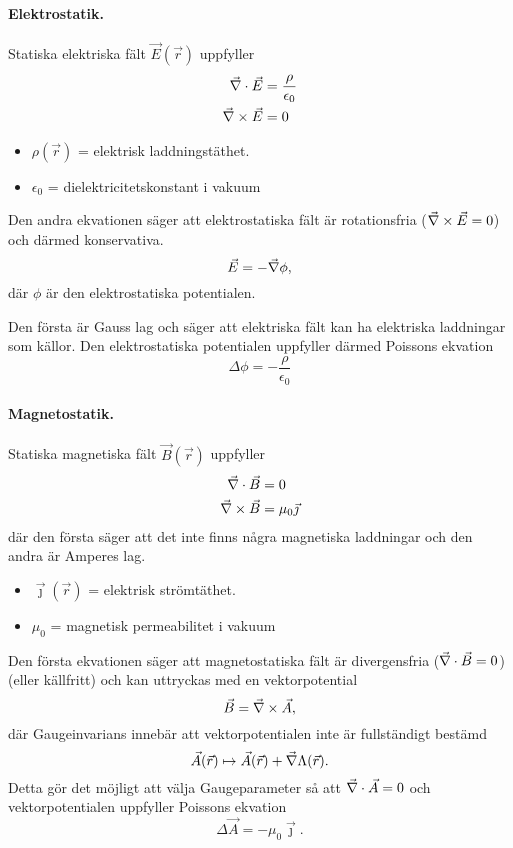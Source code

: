 \documentclass[%
oneside,                 %
final,                   %
10pt]{article}
\begin{document}
\paragraph{Elektrostatik.}


\vspace{3mm}


Statiska elektriska fält $\vec{E}(\vec{r})$ uppfyller
\begin{align}
  \vec{\nabla} \cdot \vec{E} &= \frac{\rho}{\epsilon_0} \\
  \vec{\nabla} \times \vec{E} &= 0
\end{align}
\begin{itemize}
\item $\rho(\vec{r})$ = elektrisk laddningstäthet.

\item $\epsilon_0$ = dielektricitetskonstant i vakuum
\end{itemize}

\noindent
Den andra ekvationen säger att elektrostatiska fält är rotationsfria ($\vec{\nabla} \times \vec{E} = 0$) och därmed konservativa. 
$$
\vec{E} = -\vec{\nabla} \phi,
$$
där $\phi$ är den elektrostatiska potentialen. 

Den första är Gauss lag och säger att elektriska fält kan ha elektriska
laddningar som källor. Den elektrostatiska potentialen uppfyller därmed Poissons ekvation
$$
\Delta \phi = - \frac{\rho}{\epsilon_0}
$$

\paragraph{Magnetostatik.}


\vspace{3mm}


Statiska magnetiska fält $\vec{B}(\vec{r})$ uppfyller
\begin{align}
  \vec{\nabla} \cdot \vec{B} &= 0 \\
  \vec{\nabla} \times \vec{B} &= \mu_0 \vec{\jmath}
\end{align}
där den första säger att det inte finns några magnetiska laddningar och den andra är Amperes lag.
\begin{itemize}
\item $\vec{\jmath}(\vec{r})$ = elektrisk strömtäthet.

\item $\mu_0$ = magnetisk permeabilitet i vakuum
\end{itemize}

\noindent
Den första ekvationen säger att magnetostatiska fält är divergensfria ($\vec{\nabla} \cdot \vec{B} = 0$) (eller källfritt) och kan uttryckas med en vektorpotential
$$
\vec{B} = \vec{\nabla} \times \vec{A},
$$
där Gaugeinvarians innebär att vektorpotentialen inte är fullständigt
bestämd
$$
\vec{A}(\vec{r}) \mapsto \vec{A}(\vec{r}) + \vec{\nabla} \Lambda(\vec{r}).
$$
Detta gör det möjligt att välja Gaugeparameter så att $\vec{\nabla} \cdot \vec{A} = 0$ och vektorpotentialen uppfyller Poissons ekvation
$$
\Delta \vec{A} = -\mu_0 \vec{\jmath}.
$$
\end{document}
